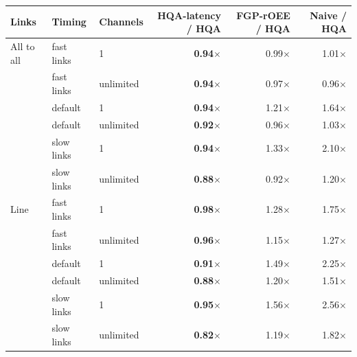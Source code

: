 \begin{tabular}{lllrrr}
\toprule
Links & Timing & Channels & HQA-latency / HQA & FGP-rOEE / HQA & Naive / HQA \\
\midrule
All to all & fast links & 1 & \textbf{0.94$\times$} & 0.99$\times$ & 1.01$\times$ \\
 & fast links & unlimited & \textbf{0.94$\times$} & 0.97$\times$ & 0.96$\times$ \\
 & default & 1 & \textbf{0.94$\times$} & 1.21$\times$ & 1.64$\times$ \\
 & default & unlimited & \textbf{0.92$\times$} & 0.96$\times$ & 1.03$\times$ \\
 & slow links & 1 & \textbf{0.94$\times$} & 1.33$\times$ & 2.10$\times$ \\
 & slow links & unlimited & \textbf{0.88$\times$} & 0.92$\times$ & 1.20$\times$ \\
\midrule
Line & fast links & 1 & \textbf{0.98$\times$} & 1.28$\times$ & 1.75$\times$ \\
 & fast links & unlimited & \textbf{0.96$\times$} & 1.15$\times$ & 1.27$\times$ \\
 & default & 1 & \textbf{0.91$\times$} & 1.49$\times$ & 2.25$\times$ \\
 & default & unlimited & \textbf{0.88$\times$} & 1.20$\times$ & 1.51$\times$ \\
 & slow links & 1 & \textbf{0.95$\times$} & 1.56$\times$ & 2.56$\times$ \\
 & slow links & unlimited & \textbf{0.82$\times$} & 1.19$\times$ & 1.82$\times$ \\
\bottomrule
\end{tabular}
